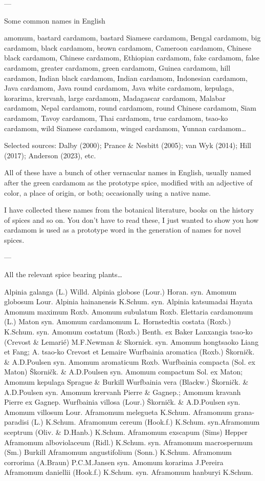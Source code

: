 \documentclass[12pt]{article}
\begin{document}
---

Some common names in English

amomum, bastard cardamom, bastard Siamese cardamom, Bengal cardamom, big cardamom, black cardamom, brown cardamom, Cameroon cardamom, Chinese black cardamom, Chinese cardamom, Ethiopian cardamom, fake cardamom, false cardamom, greater cardamom, green cardamom, Guinea cardamom, hill cardamon, Indian black cardamom, Indian cardamom, Indonesian cardamom, Java cardamom, Java round cardamom, Java white cardamom, kepulaga, korarima, krervanh, large cardamom, Madagascar cardamom, Malabar cardamom, Nepal cardamom, round cardamom, round Chinese cardamom, Siam cardamom, Tavoy cardamom, Thai cardamom, true cardamom, tsao-ko cardamom, wild Siamese cardamom, winged cardamom, Yunnan cardamom…

Selected sources: Dalby (2000); Prance \& Nesbitt (2005); van Wyk (2014); Hill (2017); Anderson (2023), etc.  



All of these have a bunch of other vernacular names in English, usually named after the green cardamom as the prototype spice, modified with an adjective of color, a place of origin, or both; occasionally using a native name.

I have collected these names from the botanical literature, books on the history of spices and so on. You don’t have to read these, I just wanted to show you how cardamom is used as a prototype word in the generation of names for novel spices.

---

All the relevant spice bearing plants…

Alpinia galanga (L.) Willd. 
Alpinia globose (Lour.) Horan. syn. Amomum globosum Lour.
Alpinia hainanensis K.Schum. syn. Alpinia katsumadai Hayata
Amomum maximum Roxb.	
Amomum subulatum Roxb.	
Elettaria cardamomum (L.) Maton syn. Amomum cardamomum L.
Hornstedtia costata (Roxb.) K.Schum. syn. Amomum costatum (Roxb.) Benth. ex Baker
Lanxangia tsao-ko (Crevost \& Lemarié) M.F.Newman \& Skornick. syn. Amomum hongtsaoko Liang et Fang; A. tsao-ko Crevost et Lemaire
Wurfbainia aromatica (Roxb.) Škorničk. \& A.D.Poulsen syn. Amomum aromaticum Roxb.
Wurfbainia compacta (Sol. ex Maton) Škorničk. \& A.D.Poulsen syn. Amomum compactum Sol. ex Maton; Amomum kepulaga Sprague \& Burkill
Wurfbainia vera (Blackw.) Škorničk. \& A.D.Poulsen syn. Amomum krervanh Pierre \& Gagnep.; Amomum kravanh Pierre ex Gagnep.
Wurfbainia villosa (Lour.) Škorničk. \& A.D.Poulsen syn. Amomum villosum Lour.
Aframomum melegueta K.Schum.	Aframomum grana-paradisi (L.) K.Schum. 
Aframomum cereum (Hook.f.) K.Schum. syn.Aframomum sceptrum (Oliv. \& D.Hanb.) K.Schum.
Aframomum exscapum (Sims) Hepper	
Aframomum alboviolaceum (Ridl.) K.Schum. syn. Aframomum macrospermum (Sm.) Burkill
Aframomum angustifolium (Sonn.) K.Schum.	
Aframomum corrorima (A.Braun) P.C.M.Jansen	 syn. Amomum korarima J.Pereira
Aframomum daniellii	(Hook.f.) K.Schum. syn. Aframomum hanburyi K.Schum.
\end{document}
